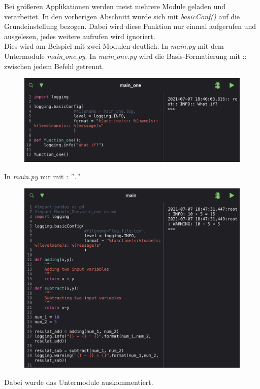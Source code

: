 Bei größeren Applikationen werden meist mehrere Module geladen und verarbeitet. 
In den vorherigen Abschnitt wurde sich mit \textit{basicConf()} auf die Grundeinstellung bezogen. Dabei wird diese Funktion nur einmal aufgerufen und ausgelesen, jedes weitere aufrufen wird ignoriert.\\

Dies wird am Beispiel mit zwei Modulen deutlich. In \textit{main.py} mit dem Untermodule \textit{main$\_$one.py}. In \textit{main$\_$one.py} wird die Basis-Formatierung mit :: zwischen jedem Befehl getrennt.  

\begin{figure}[H]
	\centering
	\includegraphics[scale = 0.5]{attachment/chapter_4/Scc030}
\end{figure}

In \textit{main.py} nur mit : $"$.$"$

\begin{figure}[H]
	\centering
	\includegraphics[scale = 0.5]{attachment/chapter_4/Scc031}
\end{figure}
Dabei wurde das Untermodule auskommentiert.\\

